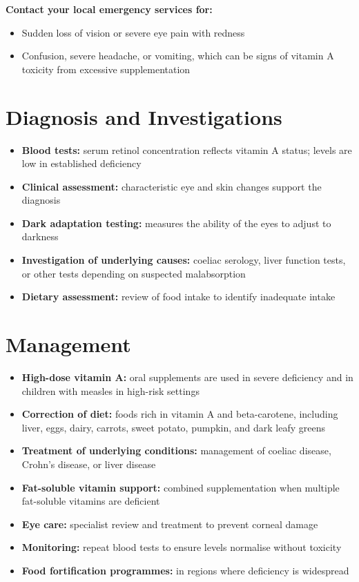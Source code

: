 \textbf{Contact your local emergency services for:}
\begin{itemize}
    \item Sudden loss of vision or severe eye pain with redness
    \item Confusion, severe headache, or vomiting, which can be signs of vitamin A toxicity from excessive supplementation
\end{itemize}

\section*{Diagnosis and Investigations}
\begin{itemize}
    \item \textbf{Blood tests:} serum retinol concentration reflects vitamin A status; levels are low in established deficiency
    \item \textbf{Clinical assessment:} characteristic eye and skin changes support the diagnosis
    \item \textbf{Dark adaptation testing:} measures the ability of the eyes to adjust to darkness
    \item \textbf{Investigation of underlying causes:} coeliac serology, liver function tests, or other tests depending on suspected malabsorption
    \item \textbf{Dietary assessment:} review of food intake to identify inadequate intake
\end{itemize}

\section*{Management}
\begin{itemize}
    \item \textbf{High-dose vitamin A:} oral supplements are used in severe deficiency and in children with measles in high-risk settings
    \item \textbf{Correction of diet:} foods rich in vitamin A and beta-carotene, including liver, eggs, dairy, carrots, sweet potato, pumpkin, and dark leafy greens
    \item \textbf{Treatment of underlying conditions:} management of coeliac disease, Crohn's disease, or liver disease
    \item \textbf{Fat-soluble vitamin support:} combined supplementation when multiple fat-soluble vitamins are deficient
    \item \textbf{Eye care:} specialist review and treatment to prevent corneal damage
    \item \textbf{Monitoring:} repeat blood tests to ensure levels normalise without toxicity
    \item \textbf{Food fortification programmes:} in regions where deficiency is widespread
\end{itemize}

